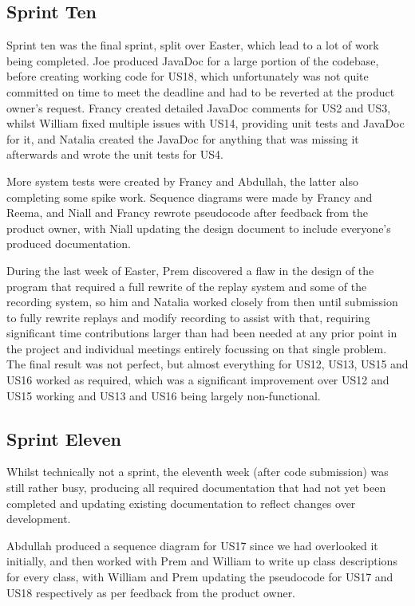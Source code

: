 \documentclass[a4paper]{project}
\begin{document}
		\subsection{Sprint Ten}\label{subsec:sprint-ten}
		
			Sprint ten was the final sprint, split over Easter, which lead to a lot of work being completed. Joe produced JavaDoc for a large portion of the codebase, before creating working code for US18, which unfortunately was not quite committed on time to meet the deadline and had to be reverted at the product owner's request. Francy created detailed JavaDoc comments for US2 and US3, whilst William fixed multiple issues with US14, providing unit tests and JavaDoc for it, and Natalia created the JavaDoc for anything that was missing it afterwards and wrote the unit tests for US4.
			
			More system tests were created by Francy and Abdullah, the latter also completing some spike work. Sequence diagrams were made by Francy and Reema, and Niall and Francy rewrote pseudocode after feedback from the product owner, with Niall updating the design document to include everyone's produced documentation.
			
			During the last week of Easter, Prem discovered a flaw in the design of the program that required a full rewrite of the replay system and some of the recording system, so him and Natalia worked closely from then until submission to fully rewrite replays and modify recording to assist with that, requiring significant time contributions larger than had been needed at any prior point in the project and individual meetings entirely focussing on that single problem. The final result was not perfect, but almost everything for US12, US13, US15 and US16 worked as required, which was a significant improvement over US12 and US15 working and US13 and US16 being largely non-functional.
			
		\subsection{Sprint Eleven}\label{subsec:sprint-eleven}
		
			Whilst technically not a sprint, the eleventh week (after code submission) was still rather busy, producing all required documentation that had not yet been completed and updating existing documentation to reflect changes over development.
			
			Abdullah produced a sequence diagram for US17 since we had overlooked it initially, and then worked with Prem and William to write up class descriptions for every class, with William and Prem updating the pseudocode for US17 and US18 respectively as per feedback from the product owner.
			
\end{document}
